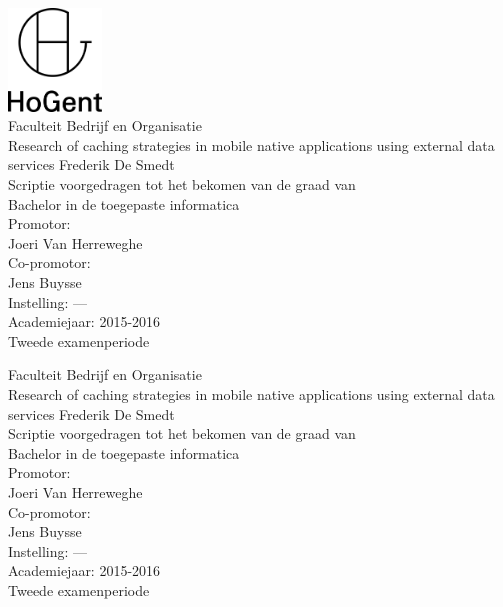 \documentclass[pdftex,a4paper,12pt,twoside]{report}
\newcommand{\emptypage}{
\newpage
\thispagestyle{empty}
\mbox{}
\newpage
}
\newcommand{\student}{Frederik De Smedt}
\newcommand{\promotor}{Joeri Van Herreweghe}
\newcommand{\copromotor}{Jens Buysse}
\newcommand{\instelling}{---}
\newcommand{\titel}{Research of caching strategies in mobile native applications using external data services}
\newcommand{\faculteit}{Faculteit Bedrijf en Organisatie}
\newcommand{\rapporttype}{Scriptie voorgedragen tot het bekomen van de graad van\\Bachelor in de toegepaste informatica}
\newcommand{\academiejaar}{2015-2016}
\newcommand{\examenperiode}{Tweede examenperiode}
\begin{document}

\begin{titlepage}
  \begin{center}

    \begingroup
    \rmfamily
    \includegraphics[width=2.5cm]{img/HG-beeldmerk-woordmerk}\\[.5cm]
    \faculteit\\[3cm]
    \titel
    \vfill
    \student\\[3.5cm]
    \rapporttype\\[2cm]
    Promotor:\\
    \promotor\\
    Co-promotor:\\
    \copromotor\\[2.5cm]
    Instelling: \instelling\\[.5cm]
    Academiejaar: \academiejaar\\[.5cm]
    \examenperiode
    \endgroup

  \end{center}
  \restoregeometry
\end{titlepage}


\emptypage


\begin{titlepage}
  \begin{center}

    \begingroup
    \rmfamily
    \faculteit\\[3cm]
    \titel
    \vfill
    \student\\[3.5cm]
    \rapporttype\\[2cm]
    Promotor:\\
    \promotor\\
    Co-promotor:\\
    \copromotor\\[2.5cm]
    Instelling: \instelling\\[.5cm]
    Academiejaar: \academiejaar\\[.5cm]
    \examenperiode
    \endgroup

  \end{center}
  \restoregeometry
\end{titlepage}
\end{document}

